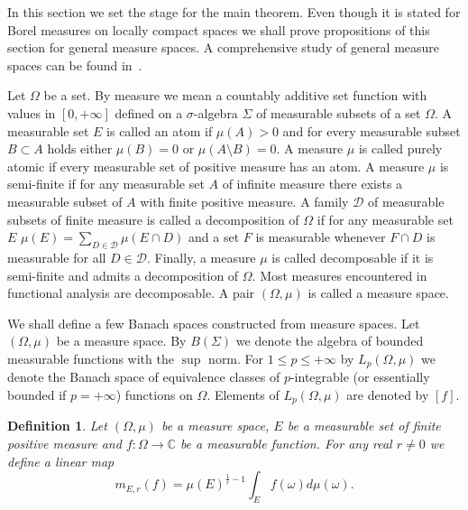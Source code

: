 \documentclass[12pt]{article}
\newtheorem{definition}[theorem]{Definition}
\begin{document}
In this section we set the stage for the main theorem. Even though it is stated
for Borel measures on locally compact spaces we shall prove propositions of this 
section for general measure spaces. A comprehensive study of general measure 
spaces can be found in~\cite{FremMeasTh2}. 

Let $\Omega$ be a set. By measure we mean a countably additive set function with
values in $[0,+\infty]$ defined on a $\sigma$-algebra $\Sigma$ of measurable
subsets of a set $\Omega$. A measurable set $E$ is called an atom if
$\mu(A)>0$ and for every measurable subset $B\subset A$ holds either $\mu(B)=0$
or $\mu(A\setminus B)=0$. A measure $\mu$ is called purely atomic if every
measurable set of positive measure has an atom. A measure $\mu$ is semi-finite
if for any measurable set $A$ of infinite measure there exists a measurable
subset of $A$ with finite positive measure. A family $\mathcal{D}$ of measurable
subsets of finite measure is called a decomposition of $\Omega$ if for any 
measurable set $E$ $\mu(E)=\sum_{D\in\mathcal{D}}\mu(E\cap D)$ and a set $F$ 
is measurable whenever $F\cap D$ is measurable for all $D\in\mathcal{D}$. 
Finally, a measure $\mu$ is called decomposable if it is semi-finite and admits 
a decomposition of $\Omega$. Most measures encountered in functional analysis 
are decomposable. A pair $(\Omega,\mu)$ is called a measure space.

We shall define a few Banach spaces constructed from measure spaces. 
Let $(\Omega,\mu)$ be a measure space. By $B(\Sigma)$ we denote the algebra of
bounded measurable functions with the  $\sup$ norm. For $1\leq p\leq +\infty$ 
by $L_p(\Omega,\mu)$ we denote the Banach space of equivalence
classes of $p$-integrable (or essentially bounded if $p=+\infty$) functions on
$\Omega$. Elements of $L_p(\Omega,\mu)$ are denoted by $[f]$.

\begin{definition}\label{GnrlzdMean}
    Let $(\Omega,\mu)$ be a measure space, $E$ be a measurable set of finite 
    positive measure and $f:\Omega\to\mathbb{C}$ be a measurable function. 
    For any real $r\neq 0$ we define a linear map
    \[
        m_{E,r}(f)=\mu(E)^{\frac{1}{r}-1}\int_E f(\omega)d\mu(\omega).
    \]
\end{definition}
\end{document}
